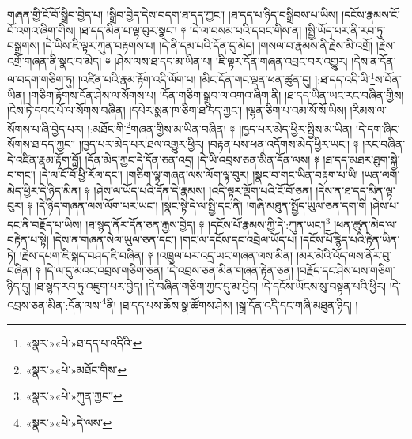 གཞན་གྱི་ངོ་བོ་སྒྲིབ་བྱེད་པ། །སྒྲིབ་བྱེད་དེས་བདག་ཐ་དད་ཀྱང་། །ཐ་དད་པ་ཉིད་བསྒྲིབས་པ་ཡིས། །དངོས་རྣམས་ངོ་བོ་འགའ་ཞིག་གིས། །ཐ་དད་མིན་པ་ལྟ་བུར་སྣང་། ༈ །དེ་ལ་བསམ་པའི་དབང་གིས་ན། །སྤྱི་ཡོད་པར་ནི་རབ་ཏུ་བསྒྲགས། །དེ་ཡིས་ཇི་ལྟར་ཀུན་བརྟགས་པ། །དེ་ནི་དམ་པའི་དོན་དུ་མེད། །གསལ་བ་རྣམས་ནི་རྗེས་མི་འགྲོ། །རྗེས་འགྲོ་གཞན་ནི་སྣང་བ་མེད། ༈ །ཤེས་ལས་ཐ་དད་མ་ཡིན་པ། །ཇི་ལྟར་དོན་གཞན་འབྲང་བར་འགྱུར། །དེས་ན་དོན་ལ་བདག་གཅིག་ཏུ། །འཛིན་པའི་རྣམ་རྟོག་འདི་ལོག་པ། །མིང་དོན་གང་ལྡན་ཕན་ཚུན་དུ། །:ཐ་དད་འདི་ཡི་\footnote{«སྣར་»«པེ་»ཐ་དད་པ་འདིའི་}ས་བོན་ཡིན། །གཅིག་རྟོགས་དོན་ཤེས་ལ་སོགས་པ། །དོན་གཅིག་སྒྲུབ་ལ་འགའ་ཞིག་ནི། །ཐ་དད་ཡིན་ཡང་རང་བཞིན་གྱིས། །ངེས་ཏེ་དབང་པོ་ལ་སོགས་བཞིན། །དཔེར་སྨན་ཁ་ཅིག་ཐ་དད་ཀྱང་། །ལྷན་ཅིག་པ་འམ་སོ་སོ་ཡིས། །རིམས་ལ་སོགས་པ་ཞི་བྱེད་པར། །:མཐོང་གི་\footnote{«སྣར་»«པེ་»མཐོང་གིས་}གཞན་གྱིས་མ་ཡིན་བཞིན། ༈ །ཁྱད་པར་མེད་ཕྱིར་སྤྱིས་མ་ཡིན། །དེ་དག་ཞིང་སོགས་ཐ་དད་ཀྱང་། །ཁྱད་པར་མེད་པར་ཐལ་འགྱུར་ཕྱིར། །བརྟན་པས་ཕན་འདོགས་མེད་ཕྱིར་ཡང་། ༈ །རང་བཞིན་དེ་འཛིན་རྣམ་རྟོག་བློ། །དོན་མེད་ཀྱང་དེ་དོན་ཅན་འདྲ། །དེ་ཡི་འབྲས་ཅན་མིན་དོན་ལས། ༈ །ཐ་དད་མཐར་ཐུག་སྐྱེ་བ་གང་། །དེ་ལ་ངོ་བོ་ཕྱི་རོལ་དང་། །གཅིག་ལྟ་གཞན་ལས་ལོག་ལྟ་བུར། །སྣང་བ་གང་ཡིན་བརྟག་པ་ཡི། །ཡན་ལག་མེད་ཕྱིར་དེ་ཉིད་མིན། ༈ །ཤེས་ལ་ཡོད་པའི་དོན་དེ་རྣམས། །འདི་ལྟར་ལྡོག་པའི་ངོ་བོ་ཅན། །དེས་ན་ཐ་དད་མིན་ལྟ་བུར། ༈ །དེ་ཉིད་གཞན་ལས་ལོག་པར་ཡང་། །སྣང་སྟེ་དེ་ལ་སྤྱི་དང་ནི། །གཞི་མཐུན་སྤྱོད་ཡུལ་ཅན་དག་གི །ཤེས་པ་དང་ནི་བརྗོད་པ་ཡིས། །ཐ་སྙད་ནོར་དོན་ཅན་རྒྱས་བྱེད། ༈ །དངོས་པོ་རྣམས་ཀྱི་དེ་:ཀུན་ཡང་།\footnote{«སྣར་»«པེ་»ཀུན་ཀྱང་།} །ཕན་ཚུན་མེད་ལ་བརྟེན་པ་སྟེ། །དེས་ན་གཞན་སེལ་ཡུལ་ཅན་དང་། །གང་ལ་དངོས་དང་འབྲེལ་ཡོད་པ། །དངོས་པོ་རྙེད་པའི་རྟེན་ཡིན་ཏེ། །རྗེས་དཔག་ཇི་སྐད་བཤད་ཇི་བཞིན། ༈ །འཁྲུལ་པར་འདྲ་ཡང་གཞན་ལས་མིན། །མར་མེའི་འོད་ལས་ནོར་བུ་བཞིན། ༈ །དེ་ལ་དུ་མའང་འབྲས་གཅིག་ཅན། །དེ་འབྲས་ཅན་མིན་གཞན་རྟེན་ཅན། །བརྗོད་དང་ཤེས་པས་གཅིག་ཉིད་དུ། །ཐ་སྙད་རབ་ཏུ་འཇུག་པར་བྱེད། །དེ་བཞིན་གཅིག་ཀྱང་དུ་མ་བྱེད། །དེ་དངོས་ཡོངས་སུ་བསྟན་པའི་ཕྱིར། །དེ་འབྲས་ཅན་མིན་:དོན་ལས་\footnote{«སྣར་»«པེ་»དེ་ལས་}ནི། །ཐ་དད་པས་ཆོས་སྣ་ཚོགས་ཤེས། །སྒྲ་དོན་འདི་དང་གཞི་མཐུན་ཉིད། །
